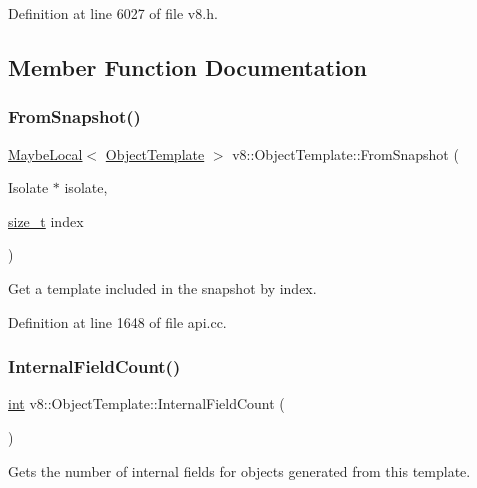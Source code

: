 Definition at line 6027 of file v8.\+h.



\subsection{Member Function Documentation}
\mbox{\label{classv8_1_1ObjectTemplate_a9cc34e327042bba1ae61cf3307a7395e}} 
\subsubsection{\texorpdfstring{From\+Snapshot()}{FromSnapshot()}}
{\footnotesize\ttfamily \mbox{\hyperlink{classv8_1_1MaybeLocal}{Maybe\+Local}}$<$ \mbox{\hyperlink{classv8_1_1ObjectTemplate}{Object\+Template}} $>$ v8\+::\+Object\+Template\+::\+From\+Snapshot (\begin{DoxyParamCaption}\item[{Isolate $\ast$}]{isolate,  }\item[{\mbox{\hyperlink{classsize__t}{size\+\_\+t}}}]{index }\end{DoxyParamCaption})\hspace{0.3cm}{\ttfamily [static]}}

Get a template included in the snapshot by index. 

Definition at line 1648 of file api.\+cc.

\mbox{\label{classv8_1_1ObjectTemplate_a43de785d594d8c01b18230b1aa79e31c}} 
\subsubsection{\texorpdfstring{Internal\+Field\+Count()}{InternalFieldCount()}}
{\footnotesize\ttfamily \mbox{\hyperlink{classint}{int}} v8\+::\+Object\+Template\+::\+Internal\+Field\+Count (\begin{DoxyParamCaption}{ }\end{DoxyParamCaption})}

Gets the number of internal fields for objects generated from this template. 

